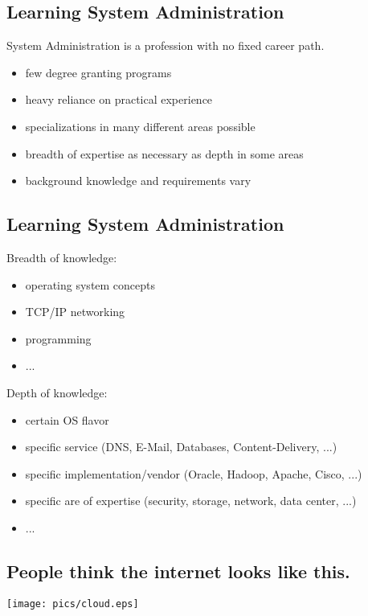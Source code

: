 \documentclass[xga]{xdvislides}
\begin{document}
\subsection{Learning System Administration}
System Administration is a profession with no fixed career path.

\begin{itemize}
	\item few degree granting programs
	\item heavy reliance on practical experience
	\item specializations in many different areas possible
	\item breadth of expertise as necessary as depth in some areas
	\item background knowledge and requirements vary
\end{itemize}

\subsection{Learning System Administration}

Breadth of knowledge:
\begin{itemize}
	\item operating system concepts
	\item TCP/IP networking
	\item programming
	\item ...
\end{itemize}
\vspace{.5in}

Depth of knowledge:
\begin{itemize}
	\item certain OS flavor
	\item specific service (DNS, E-Mail, Databases, Content-Delivery, ...)
	\item specific implementation/vendor (Oracle, Hadoop, Apache, Cisco, ...)
	\item specific are of expertise (security, storage, network, data center, ...)
	\item ...
\end{itemize}

\subsection{People think the internet looks like this.}
\begin{center}
	\texttt{[image: pics/cloud.eps]}
\end{center}
\end{document}
